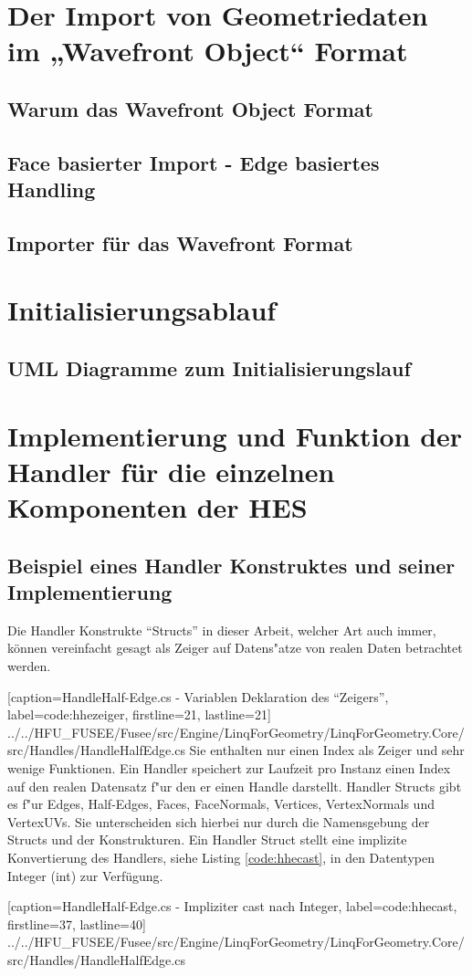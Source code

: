 \documentclass[pagesize, paper=a4, fontsize=12pt,titlepage=true, headings=small, headnosepline, abstractoff, liststotoc, nochapterprefix, plainheadsepline]{scrreprt}
\begin{document}
	\section {Der Import von Geometriedaten im „Wavefront Object“ Format}
		\subsection {Warum das Wavefront Object Format}
		\subsection {Face basierter Import - Edge basiertes Handling}
		\subsection {Importer für das Wavefront Format}
	\section {Initialisierungsablauf}
		\subsection {UML Diagramme zum Initialisierungslauf}
	\section {Implementierung und Funktion der Handler für die einzelnen Komponenten der HES}
		\subsection {Beispiel eines Handler Konstruktes und seiner Implementierung}
Die Handler Konstrukte "`Structs"' in dieser Arbeit, welcher Art auch immer, können vereinfacht gesagt als Zeiger auf Datens"atze von realen Daten betrachtet werden.

			[caption={HandleHalf-Edge.cs - Variablen Deklaration des "`Zeigers"'}, label=code:hhezeiger, firstline=21, lastline=21]
			{../../HFU_FUSEE/Fusee/src/Engine/LinqForGeometry/LinqForGeometry.Core/src/Handles/HandleHalfEdge.cs}
Sie enthalten nur einen Index als Zeiger und sehr wenige Funktionen. Ein Handler speichert zur Laufzeit pro Instanz einen Index auf den realen Datensatz f"ur den er einen Handle darstellt. Handler Structs gibt es f"ur Edges, Half-Edges, Faces, FaceNormals, Vertices, VertexNormals und VertexUVs. Sie unterscheiden sich hierbei nur durch die Namensgebung der Structs und der Konstrukturen.
Ein Handler Struct stellt eine implizite Konvertierung des Handlers, siehe Listing \ref{code:hhecast}, in den Datentypen Integer (int) zur Verfügung.

			[caption={HandleHalf-Edge.cs - Impliziter cast nach Integer}, label=code:hhecast, firstline=37, lastline=40]
			{../../HFU_FUSEE/Fusee/src/Engine/LinqForGeometry/LinqForGeometry.Core/src/Handles/HandleHalfEdge.cs}
\end{document}
